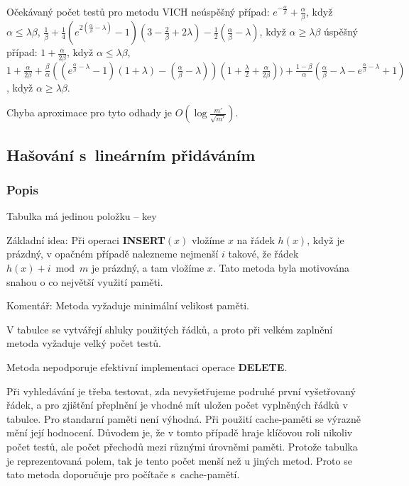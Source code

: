 \documentclass[a4paper,12pt]{article}
\begin{document}
Očekávaný počet testů pro metodu VICH\newline 
neúspěšný případ:\newline 
\phantom{---}$e^{-\frac {\alpha}{\beta}}+\frac {\alpha}{\beta}$, když  $
\alpha\le\lambda\beta$, \newline 
\phantom{---}$\frac 1{\beta}+\frac 14(e^{2(\frac {\alpha}{\beta}-
\lambda )}-1)(3-\frac 2{\beta}+2\lambda )-\frac 12(\frac {\alpha}{
\beta}-\lambda )$, když $\alpha\ge\lambda\beta$\newline 
úspěšný případ:\newline 
\phantom{---}$1+\frac {\alpha}{2\beta}$, když $\alpha\le\lambda
\beta$, \newline 
\phantom{---}$1+\frac {\alpha}{2\beta}+\frac {\beta}{\alpha}((e^{\frac {
\alpha}{\beta}-\lambda}-1)(1+\lambda )-(\frac {\alpha}{\beta}-\lambda 
))(1+\frac {\lambda}2+\frac {\alpha}{2\beta}))+\frac {1-\beta}{\alpha}
(\frac {\alpha}{\beta}-\lambda -e^{\frac {\alpha}{\beta}-\lambda}
+1)$, 
když $\alpha\ge\lambda\beta$.

Chyba aproximace pro tyto odhady je $O(\log\frac {m'}{\sqrt {
m'}})$.

\subsection{Hašování s~lineárním přidáváním}

\subsubsection{Popis}

Tabulka má jedinou položku -- key

Základní idea:  Při operaci {\bf INSERT$(x)$} vložíme $
x$ 
na řádek $h(x)$, když je prázdný, v opačném případě 
nalezneme nejmenší $i$ takové, že řádek $h(x)+i\bmod 
m$ je 
prázdný, a tam vložíme $x$. Tato metoda byla motivována snahou o co největší využití paměti. 

Komentář:  Metoda vyžaduje minimální velikost paměti.  

V tabulce se vytvářejí shluky použitých řádků, a proto 
při velkém zaplnění metoda vyžaduje velký počet testů. 
 
Metoda nepodporuje efektivní implementaci operace {\bf DELETE}.  

Při vy\-hle\-dá\-vá\-ní je třeba testovat, zda nevyšetřujeme 
podruhé první vyšetřovaný řádek, a pro zjištění přeplnění je 
vhodné mít uložen počet vyplněných řádků v tabulce. Pro standarní paměti není výhodná. Při použití cache-paměti se výrazně mění její hodnocení. Důvodem je, že v tomto případě hraje klíčovou roli nikoliv počet testů, ale počet přechodů mezi různými úrovněmi paměti. Protože tabulka je reprezentovaná polem, tak je tento počet menší než u jiných metod. Proto se tato metoda doporučuje pro počítače s~cache-pamětí.
\end{document}
